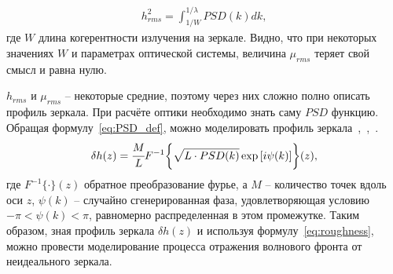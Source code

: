 \begin{align}
	h^2_{rms} =  \int^{1/\lambda}_{1/W} PSD(k) dk,
\end{align}
где $W$ длина когерентности излучения на зеркале. Видно, что при некоторых значениях $W$ и параметрах оптической системы, величина $\mu_{rms}$ теряет свой смысл и равна нулю. 

$h_{rms}$ и $\mu_{rms}$ -- некоторые средние, поэтому через них сложно полно описать профиль зеркала. При расчёте оптики необходимо знать саму $PSD$ функцию. Обращая формулу~\ref{eq:PSD_def}, можно моделировать профиль зеркала~\cite{hua_using_2013},~\cite{xu_statistical_2012},~\cite{barty_predicting_2009}.
\begin{align}
	\delta h(z) = \cfrac{M}{L} F^{-1} \bigg\{\sqrt{L \cdot PSD(k)} \exp{[i \psi(k)]} \bigg\}(z),
\end{align}
где $F^{-1}\{\cdot\}(z)$ обратное преобразование фурье, а $M$ -- количество точек вдоль оси $z$, $\psi(k)$ -- случайно сгенерированная фаза, удовлетворяющая условию $-\pi < \psi(k) <\pi$, равномерно распределенная в этом промежутке. Таким образом, зная профиль зеркала $\delta h(z)$ и используя формулу~\ref{eq:roughness}, можно провести моделирование процесса отражения волнового фронта от неидеального зеркала.
\normalsize%
